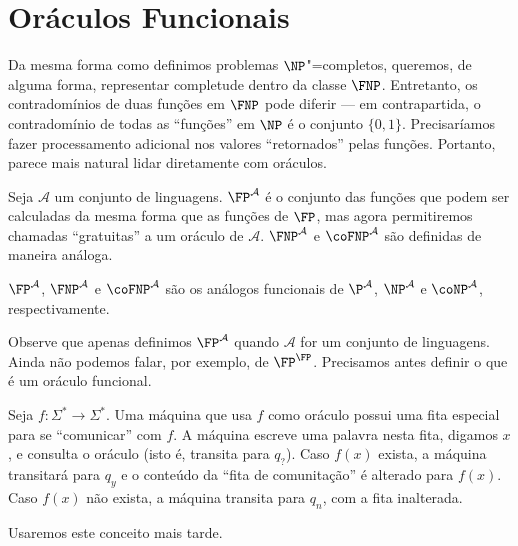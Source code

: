 \section{Oráculos Funcionais}

Da mesma forma como definimos problemas $\NP$"=completos,
queremos, de alguma forma,
representar completude dentro da classe $\FNP$.
Entretanto,
os contradomínios de duas funções em $\FNP$ pode diferir
--- em contrapartida,
o contradomínio de todas as ``funções'' em $\NP$ é o conjunto $\{0, 1\}$.
Precisaríamos fazer processamento adicional
nos valores ``retornados'' pelas funções.
Portanto,
parece mais natural lidar diretamente com oráculos.

\begin{definition}
    Seja $\mathcal A$ um conjunto de linguagens.
    $\FP^\mathcal A$ é o conjunto das funções
    que podem ser calculadas da mesma forma que as funções de $\FP$,
    mas agora permitiremos chamadas ``gratuitas'' a um oráculo de $\mathcal A$.
    $\FNP^\mathcal A$ e $\coFNP^\mathcal A$
    são definidas de maneira análoga.
\end{definition}

$\FP^\mathcal A$, $\FNP^\mathcal A$ e $\coFNP^\mathcal A$
são os análogos funcionais de
$\P^\mathcal A$, $\NP^\mathcal A$ e $\coNP^\mathcal A$,
respectivamente.

Observe que apenas definimos $\FP^\mathcal A$
quando $\mathcal A$ for um conjunto de linguagens.
Ainda não podemos falar, por exemplo, de $\FP^\FP$.
Precisamos antes definir o que é um oráculo funcional.

\begin{definition}
    Seja $f : \Sigma^* \rightarrow \Sigma^*$.
    Uma máquina que usa $f$ como oráculo
    possui uma fita especial para se ``comunicar'' com $f$.
    A máquina escreve uma palavra nesta fita,
    digamos $x$,
    e consulta o oráculo
    (isto é, transita para $q_?$).
    Caso $f(x)$ exista,
    a máquina transitará para $q_y$
    e o conteúdo da ``fita de comunitação'' é alterado para $f(x)$.
    Caso $f(x)$ não exista,
    a máquina transita para $q_n$,
    com a fita inalterada.
\end{definition}

Usaremos este conceito mais tarde.

